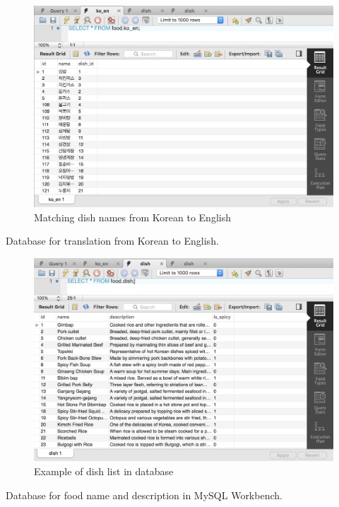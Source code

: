 \FloatBarrier

\begin{figure}[htbp]
\centerline{\includegraphics[width=\linewidth]{./pictures/database_ko_eng}}
\caption{Matching dish names from Korean to English}
\label{fig:Matching dish names from Korean to English}
\end{figure}
\FloatBarrier
Database for translation from Korean to English.

\begin{figure}[htbp]
\centerline{\includegraphics[width=\linewidth]{./pictures/database_dish_list}}
\caption{Example of dish list in database}
\label{fig:Example of dish list in database}
\end{figure}
\FloatBarrier
Database for food name and description in MySQL Workbench.\newline\newline

